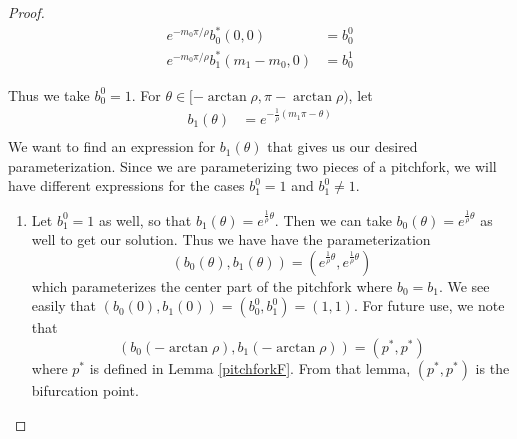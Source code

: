 \documentclass[thesis.tex]{subfiles}
\begin{document}
\begin{lemma}
\begin{proof}
\begin{align*}
e^{-m_0 \pi/\rho} b_0^*(0, 0) &= b_0^0 \\
e^{-m_0 \pi/\rho} b_1^*(m_1 - m_0, 0) &= b_0^1
\end{align*}

Thus we take $b_0^0 = 1$. For $\theta \in [-\arctan \rho,\pi - \arctan \rho)$, let
\begin{align*}
b_1(\theta) &= e^{ -\frac{1}{\rho}(m_1 \pi - \theta) } \\
\end{align*}
We want to find an expression for $b_1(\theta)$ that gives us our desired parameterization. Since we are parameterizing two pieces of a pitchfork, we will have different expressions for the cases $b_1^0 = 1$ and $b_1^0 \neq 1$. 
\begin{enumerate}
	\item Let $b_1^0 = 1$ as well, so that $b_1(\theta) = e^{ \frac{1}{\rho}\theta }$. Then we can take $b_0(\theta) = e^{ \frac{1}{\rho}\theta }$ as well to get our solution. Thus we have have the parameterization
	\[
	( b_0(\theta), b_1(\theta) ) = ( e^{ \frac{1}{\rho}\theta }, e^{ \frac{1}{\rho}\theta })
	\]
	which parameterizes the center part of the pitchfork where $b_0 = b_1$. We see easily that $(b_0(0), b_1(0)) = (b_0^0, b_1^0) = (1,1)$. For future use, we note that
	\[
	(b_0(-\arctan \rho), b_1(-\arctan \rho)) = (p^*, p^*)
	\]
	where $p^*$ is defined in Lemma \ref{pitchforkF}. From that lemma, $(p^*, p^*)$ is the bifurcation point.


\end{enumerate}
\end{proof}
\end{lemma}
\end{document}

